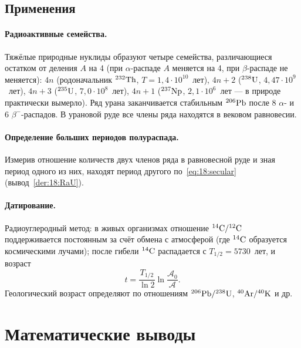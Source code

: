 \subsection{Применения}

\paragraph{Радиоактивные семейства.} Тяжёлые природные нуклиды образуют четыре семейства, различающиеся остатком
от деления $A$ на 4 (при $\alpha$-распаде $A$ меняется на 4, при $\beta$-распаде не меняется): $4n$ (родоначальник $\nucl{Th}{232}$,
$T=1{,}4\cdot10^{10}$~лет), $4n+2$ ($\nucl{U}{238}$, $4{,}47\cdot10^9$~лет), $4n+3$ ($\nucl{U}{235}$, $7{,}0\cdot10^8$~лет), $4n+1$ ($\nucl{Np}{237}$,
$2{,}1\cdot10^6$~лет — в природе практически вымерло). Ряд урана заканчивается стабильным $\nucl{Pb}{206}$ после 8 $\alpha$- и
6 $\beta^-$-распадов. В урановой руде все члены ряда находятся в вековом равновесии.

\paragraph{Определение больших периодов полураспада.} Измерив отношение количеств двух членов ряда в равновесной руде и зная
период одного из них, находят период другого по~\eqref{eq:18:secular} (вывод~\ref{der:18:RaU}).

\paragraph{Датирование.} Радиоуглеродный метод: в живых организмах отношение $\nucl{C}{14}/\nucl{C}{12}$ поддерживается постоянным
за счёт обмена с атмосферой (где $\nucl{C}{14}$ образуется космическими лучами); после гибели $\nucl{C}{14}$ распадается с
$T_{1/2}=5730$~лет, и возраст
\begin{equation}\label{eq:18:dating}
  t=\frac{T_{1/2}}{\ln2}\ln\frac{\mathcal A_0}{\mathcal A}.
\end{equation}
Геологический возраст определяют по отношениям $\nucl{Pb}{206}/\nucl{U}{238}$, $\nucl{Ar}{40}/\nucl{K}{40}$ и др.

\section{Математические выводы}


